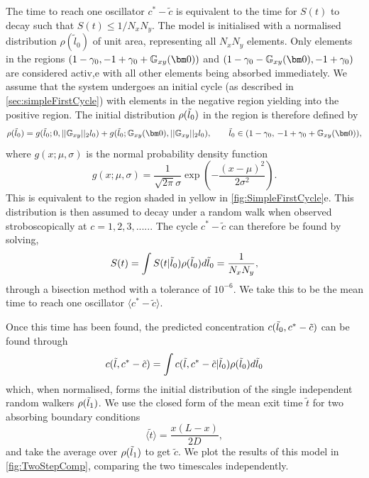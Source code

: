 The time to reach one oscillator $c^* - \tilde{c}$ is equivalent to the time for $S(t)$ to decay such that $S(t) \leq 1/N_xN_y$. The model is initialised with a normalised distribution $\rho(\tilde{l}_0)$ of unit area, representing all $N_xN_y$ elements. Only elements in the regions $(1-\gammaMax, -1+\gammaMax+\Origin)$ and $( 1-\gammaMax-\Origin,-1+\gammaMax)$ are considered activ,e with all other elements being absorbed immediately. We assume that the system undergoes an initial cycle (as described in \cref{sec:simpleFirstCycle}) with elements in the negative region yielding into the positive region. The initial distribution $\rho(\tilde{l}_0)$ in the region is therefore defined by
\begin{equation}
\rho(\ltilde_0)
= g(\ltilde_0; 0, \Norm l_0) + g(\ltilde_0; \Origin, \Norm l_0),
\qquad
\ltilde_0 \in (1-\gammaMax,\,-1+\gammaMax+\Origin),
\end{equation}
where $g(x;\mu,\sigma)$ is the normal probability density function
\begin{equation}
g(x;\mu,\sigma)
= \frac{1}{\sqrt{2\pi}\sigma}
\exp\left(-\frac{(x-\mu)^2}{2\sigma^2}\right).
\end{equation}
This is equivalent to the region shaded in yellow in \cref{fig:SimpleFirstCycle}e. This distribution is then assumed to decay under a random walk when observed stroboscopically at $c=1,2,3,.....$. The cycle $c^* - \tilde{c}$ can therefore be found by solving,
\begin{equation}
    S(t) = \int S(t|\tilde{l}_0)\rho(\tilde{l}_0) d\tilde{l}_0 = \frac{1}{N_xN_y},
\end{equation}
through a bisection method with a tolerance of $10^{-6}$. We take this to be the mean time to reach one oscillator $\langle c^* - \tilde{c} \rangle$.  

Once this time has been found, the predicted concentration $c(\tilde{l}_0, c^* - \tilde{c})$ can be found through
\begin{equation}
    c(\tilde{l},c^* - \tilde{c}) = \int c(\tilde{l},c^* - \tilde{c}|\tilde{l}_0)\rho(\tilde{l}_0) d\tilde{l}_0
\end{equation}
which, when normalised, forms the initial distribution of the single independent random walkers $\rho(\tilde{l}_1)$. We use the closed form of the mean exit time $\tilde{t}$ for two absorbing boundary conditions
\begin{equation}
    \langle \tilde{t} \rangle = \frac{x(L-x)}{2D},
\end{equation}
and take the average over $\rho(\tilde{l}_1)$ to get $\tilde{c}$. We plot the results of this model in \cref{fig:TwoStepComp}, comparing the two timescales independently.

